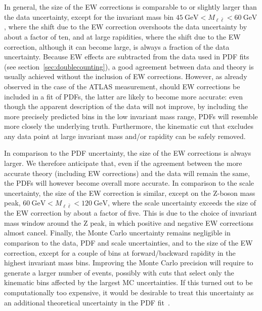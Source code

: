 In general, the size of the EW corrections is comparable to or slightly larger
than the data uncertainty, except for the invariant mass bin 
$\SI{45}{\giga\electronvolt}<M_{\ell\bar\ell}<\SI{60}{\giga\electronvolt}$,
where the shift due to the EW correction overshoots the data uncertainty by
about a factor of ten, and at large rapidities, where the shift due to the EW
correction, although it can become large, is always a fraction of the data
uncertainty. Because EW effects are subtracted from the data used
in PDF fits (see section~\ref{sec:doublecounting}), a good agreement between
data and theory is usually achieved without the inclusion of EW corrections.
However, as already observed in the case of the ATLAS measurement, should EW
corrections be included in a fit of PDFs, the latter are likely to become more
accurate: even though the apparent description of the data will not
improve, by including the more precisely predicted bins in the low invariant mass range, PDFs
will resemble more closely the underlying truth. Furthermore, the kinematic cut
that excludes any data point at large invariant mass and/or rapidity can be
safely removed.

In comparison to the PDF uncertainty, the size of the EW corrections is always
larger. We therefore anticipate that, even if the agreement between the more
accurate theory (including EW corrections) and the data will remain the same,
the PDFs will however become overall more accurate. In comparison to the scale
uncertainty, the size of the EW correction is similar, except on the Z-boson
mass peak, $\SI{60}{\giga\electronvolt}<M_{\ell\bar\ell}<\SI{120}{\giga\electronvolt}$, where the scale uncertainty exceeds
the size of the EW correction by about a factor of five. This is due to the choice
of invariant mass window around the Z peak, in which positive and negative EW corrections almost cancel.
Finally, the Monte Carlo uncertainty remains negligible
in comparison to the data, PDF and scale uncertainties, and to the size of the
EW correction, except for a couple of bins at forward/backward rapidity in the highest
invariant mass bins. Improving the Monte Carlo precision will require to
generate a larger number of events, possibly with cuts that select
only the kinematic bins affected by the largest MC uncertainties. If this
turned out to be computationally too expensive, it would be desirable to treat
this uncertainty as an additional theoretical uncertainty in the PDF
fit~\cite{Ball:2018lag}.


